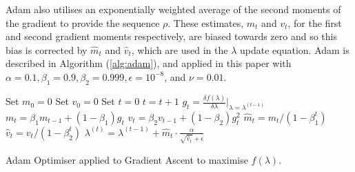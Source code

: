 \documentclass[12pt,a4paper]{article}\usepackage[]{graphicx}\usepackage[]{color}
\begin{document}
Adam also utilises an exponentially weighted average of the second moments of the gradient to provide the sequence $\rho$. These estimates, $m_t$ and $v_t$, for the first and second gradient moments respectively, are biased towards zero and so this bias is corrected by $\hat{m}_t$ and $\hat{v}_t$, which are used in the $\lambda$ update equation. Adam is described in Algorithm (\ref{alg:adam}), and applied in this paper with $\alpha = 0.1, \beta_1 = 0.9, \beta_2 = 0.999, \epsilon = 10^{-8}$, and $\nu = 0.01$.

\begin{algorithm}[H]
 Set $m_0 = 0$\;
 Set $v_0 = 0$\;
 Set $t = 0$\;
  {
  $t = t + 1$\;
  $g_t = \frac{\delta f(\lambda)}{\delta \lambda} \rvert_{\lambda = \lambda^{(t-1)}}$ \;
  $m_t = \beta_1 m_{t-1} + (1-\beta_1) g_t$ \;
  $v_t = \beta_2 v_{t-1} + (1-\beta_2) g_t^2$ \;
  $\hat{m}_t = m_t / (1 - \beta_1^t)$ \;
  $\hat{v}_t = v_t / (1 - \beta_2^t)$ \;
  $\lambda^{(t)} = \lambda^{(t-1)} + \hat{m}_t \cdot \frac{\alpha}{\sqrt{\hat{v}_t} + \epsilon}$
  }
 \caption{Adam Optimiser applied to Gradient Ascent to maximise $f(\lambda)$.}
  \label{alg:adam}
\end{algorithm}
\end{document}
